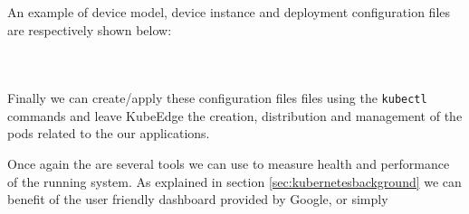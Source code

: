 An example of device model, device instance and deployment configuration files are respectively shown below:

\inputminted[frame=single,
framesep=2mm,
baselinestretch=1.2,
fontsize=\footnotesize,
linenos,
breaklines]{yaml}{sourcecode/led-light-device-model.yaml}


\inputminted[frame=single,
framesep=2mm,
baselinestretch=1.2,
fontsize=\footnotesize,
linenos,
breaklines]{yaml}{sourcecode/led-light-device-instance.yaml}


\inputminted[frame=single,
framesep=2mm,
baselinestretch=1.2,
fontsize=\footnotesize,
linenos,
breaklines]{yaml}{sourcecode/deployment.yaml}


Finally we can create/apply these configuration files files using the \texttt{kubectl} commands and leave KubeEdge the creation, distribution and management of the pods related to the our applications.

Once again the are several tools we can use to measure health and performance of the running system. As explained in section \ref{sec:kubernetesbackground} we can benefit of the user friendly dashboard provided by Google, or simply 


\clearpage
\thispagestyle{empty}




















